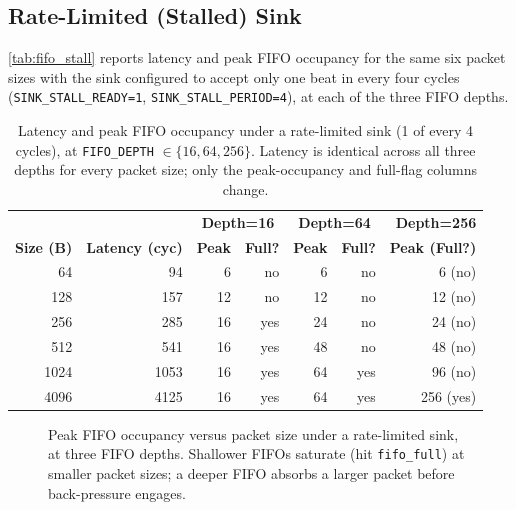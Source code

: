 \subsection{Rate-Limited (Stalled) Sink}
\label{sec:ch7_fifo_stall}

\autoref{tab:fifo_stall} reports latency and peak FIFO occupancy for the same six packet sizes with the sink configured to accept only one beat in every four cycles (\texttt{SINK\_STALL\_READY=1}, \texttt{SINK\_STALL\_PERIOD=4}), at each of the three FIFO depths.

\begin{table}[htbp]
\centering
\begin{tabular}{@{}rrrrrrr@{}}
\toprule
& & \multicolumn{2}{c}{\textbf{Depth=16}} & \multicolumn{2}{c}{\textbf{Depth=64}} & \textbf{Depth=256} \\
\textbf{Size (B)} & \textbf{Latency (cyc)} & \textbf{Peak} & \textbf{Full?} & \textbf{Peak} & \textbf{Full?} & \textbf{Peak (Full?)} \\
\midrule
64   & 94   & 6  & no  & 6  & no  & 6 (no) \\
128  & 157  & 12 & no  & 12 & no  & 12 (no) \\
256  & 285  & 16 & yes & 24 & no  & 24 (no) \\
512  & 541  & 16 & yes & 48 & no  & 48 (no) \\
1024 & 1053 & 16 & yes & 64 & yes & 96 (no) \\
4096 & 4125 & 16 & yes & 64 & yes & 256 (yes) \\
\bottomrule
\end{tabular}
\caption{Latency and peak FIFO occupancy under a rate-limited sink (1 of every 4 cycles), at \texttt{FIFO\_DEPTH} $\in \{16, 64, 256\}$. Latency is identical across all three depths for every packet size; only the peak-occupancy and full-flag columns change.}
\label{tab:fifo_stall}
\end{table}

\begin{figure}[htbp]
\centering
{}
\caption{Peak FIFO occupancy versus packet size under a rate-limited sink, at three FIFO depths. Shallower FIFOs saturate (hit \texttt{fifo\_full}) at smaller packet sizes; a deeper FIFO absorbs a larger packet before back-pressure engages.}
\label{fig:fifo_occupancy}
\end{figure}

